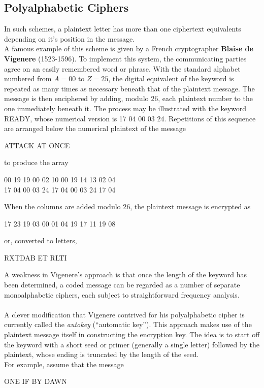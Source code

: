 \documentclass{article}
\begin{document}
\subsection{Polyalphabetic Ciphers}
In such schemes, a plaintext letter has more than one ciphertext equivalents depending on it's position in the message.\\
A famous example of this scheme is given by a French cryptographer {\bf Blaise de Vigenere} (1523-1596). To implement this system, the communicating parties agree on an easily remembered word or phrase. With the standard alphabet numbered from $A = 00$ to $Z = 25$, the digital equivalent of the keyword is repeated as many times as necessary beneath that of the plaintext message. The message is then enciphered by adding, modulo 26, each plaintext number to the one immediately beneath it. The process may be illustrated with the keyword READY, whose numerical version is 17 04 00 03 24. Repetitions of this sequence are arranged below the numerical plaintext of the message
\begin{center}
    ATTACK AT ONCE
\end{center}
to produce the array
\begin{center}
    00 19 19 00 02 10 00 19 14 13 02 04\\
    17 04 00 03 24 17 04 00 03 24 17 04
\end{center}
When the columns are added modulo 26, the plaintext message is encrypted as
\begin{center}
    17 23 19 03 00 01 04 19 17 11 19 08
\end{center}
or, converted to letters,
\begin{center}
    RXTDAB ET RLTI
\end{center}
A weakness in Vigenere's approach is that once the length of the keyword has been determined, a coded message can be regarded as a number of separate monoalphabetic ciphers, each subject to straightforward frequency analysis.\\ \\
A clever modification that Vigenere contrived for his polyalphabetic cipher is currently called the {\it autokey} (“automatic key”). This approach makes use of the plaintext message itself in constructing the encryption key. The idea is to start off the keyword with a short seed or primer (generally a single letter) followed by the plaintext, whose ending is truncated by the length of the seed.\\
For example, assume that the message
\begin{center}
    ONE IF BY DAWN
\end{center}
\end{document}
